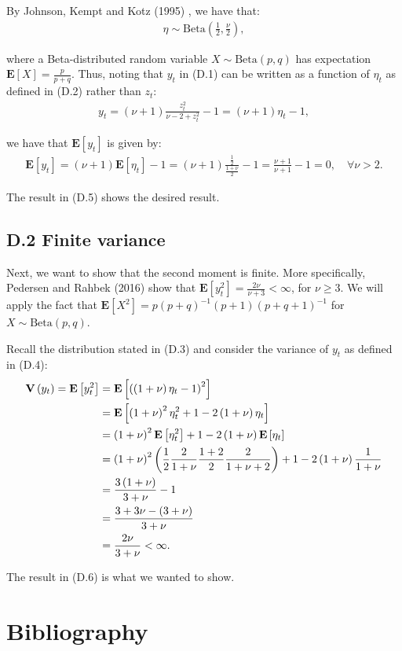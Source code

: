 \documentclass[11pt,a4paper,oneside]{article}
\newcommand{\lp}{\left(}
\newcommand{\rp}{\right)}
\newcommand{\rb}{\right]}
\newcommand{\lb}{\left[}
\newcommand{\ee}{\mathbf{E}}
\newcommand{\vv}{\mathbf{V}}
\begin{document}
By Johnson, Kempt and Kotz (1995) \cite{johnson1995continuous}, we have that:
\begin{align}
    \eta \sim \text{Beta}\lp \frac{1}{2}, \frac{\nu}{2}\rp,
\end{align}

where a Beta-distributed random variable $X \sim \text{Beta}\lp p, q\rp$ has expectation $\ee\lb X\rb = \frac{p}{p + q}$. Thus, noting that $y_t$ in (D.1) can be written as a function of $\eta_t$ as defined in (D.2) rather than $z_t$:
\begin{align}
    y_t = \lp \nu + 1\rp \frac{z_t^2}{\nu - 2 +z_t^2} - 1 = \lp \nu + 1\rp \eta_t - 1,
\end{align}

we have that $\ee\lb y_t\rb$ is given by:
\begin{align}
    \ee\lb y_t\rb = \lp \nu + 1\rp \ee\lb \eta_t\rb - 1 = \lp \nu + 1\rp \frac{\frac{1}{2}}{\frac{1 + \nu}{2}} - 1 = \frac{\nu + 1}{\nu + 1} - 1 = 0, \quad \forall \nu > 2.
\end{align}

The result in (D.5) shows the desired result.

\subsection{D.2 Finite variance}
Next, we want to show that the second moment is finite. More specifically, Pedersen and Rahbek (2016) show that $\ee\lb y_t^2\rb = \frac{2\nu}{\nu + 3}< \infty$, for $\nu \geq 3$. We will apply the fact that $\ee\lb X^2\rb = p \lp p + q\rp^{-1} \lp p + 1\rp \lp p + q + 1\rp^{-1}$ for $X \sim \text{Beta}\lp p, q\rp$.

Recall the distribution stated in (D.3) and consider the variance of $y_t$ as defined in (D.4):
\begin{align}
    \vv\lp y_t\rp = \ee\lb y_t^2 \rb 
        &= \ee\lb \lp  \lp 1 + \nu \rp \eta_t - 1 \rp^2\rb \notag \\
        &= \ee\lb \lp 1 + \nu\rp^2\eta_t^2 + 1 - 2 \lp 1 + \nu\rp \eta_t\rb \notag\\
        &= \lp 1 + \nu\rp^2 \ee\lb \eta_t^2\rb + 1 - 2\lp 1 + \nu\rp \ee\lb \eta_t\rb\notag\\
        &= \lp 1 + \nu\rp^2 \lp \frac{1}{2}\frac{2}{1 + \nu}\frac{1 + 2}{2}\frac{2}{1 + \nu + 2}\rp + 1 - 2 \lp 1 + \nu\rp \frac{1}{1 + \nu}\notag\\
        &= \frac{3 \lp 1 + \nu\rp}{3 + \nu} -1\notag\\
        &= \frac{3 + 3\nu - \lp 3 + \nu\rp }{3 + \nu}\notag\\
        &= \frac{2\nu}{3 + \nu} < \infty.\notag
\end{align}

The result in (D.6) is what we wanted to show.

\clearpage

\section{Bibliography}
\printbibliography[heading=none]
\end{document}
